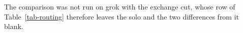 The comparison was not run on grok with the exchange cut, whose row of
Table~\ref{tab-routing} therefore leaves the solo and the two differences
from it blank.
